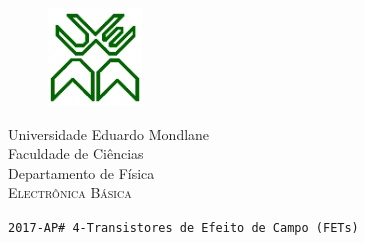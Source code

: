 \documentclass[12pt,a4paper,titlepage]{report}
\author{Bartolomeu J. Ubisse}
\begin{document}
\begin{figure}[htb]

\centering
\includegraphics[scale=1]{UEM-logotipo}
\end{figure}
\centering
{ \Large Universidade Eduardo Mondlane}\\[0.3cm] 
\large Faculdade de Ci\^encias\\[0.2cm]
 \large Departamento de F\'isica\\[0.5cm]

\textsc{Electr\^onica B\'asica} \\[1cm]
\begin{flushleft}
\tt 2017-AP\# 4-Transistores de Efeito de Campo (FETs)\\
\hrulefill
\end{flushleft}
\end{document}
